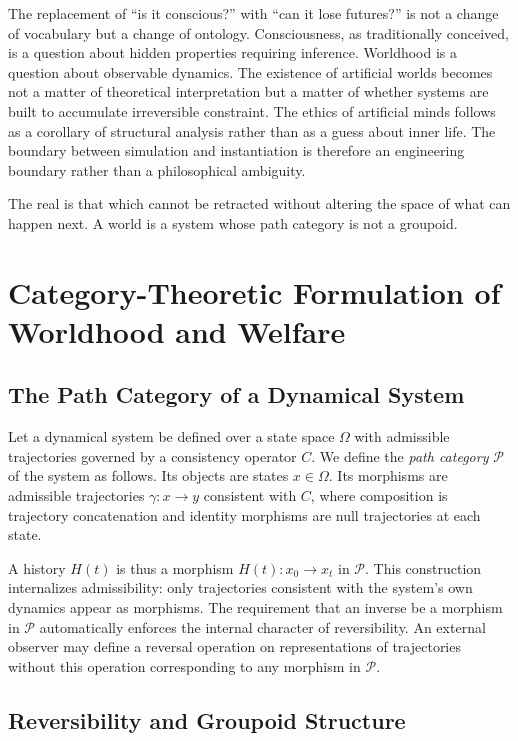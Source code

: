 \documentclass[11pt]{article}
\theoremstyle{definition}
\theoremstyle{remark}
\begin{document}
The replacement of ``is it conscious?'' with ``can it lose futures?'' is not a change of
vocabulary but a change of ontology. Consciousness, as traditionally conceived, is a question
about hidden properties requiring inference. Worldhood is a question about observable
dynamics. The existence of artificial worlds becomes not a matter of theoretical interpretation
but a matter of whether systems are built to accumulate irreversible constraint. The ethics
of artificial minds follows as a corollary of structural analysis rather than as a guess
about inner life. The boundary between simulation and instantiation is therefore an
engineering boundary rather than a philosophical ambiguity.

The real is that which cannot be retracted without altering the space of what can happen
next. A world is a system whose path category is not a groupoid.

\appendix
\section{Category-Theoretic Formulation of Worldhood and Welfare}

\subsection{The Path Category of a Dynamical System}

Let a dynamical system be defined over a state space $\Omega$ with admissible trajectories
governed by a consistency operator $C$. We define the \emph{path category} $\mathcal{P}$
of the system as follows. Its objects are states $x \in \Omega$. Its morphisms are admissible
trajectories $\gamma: x \to y$ consistent with $C$, where composition is trajectory
concatenation and identity morphisms are null trajectories at each state.

A history $H(t)$ is thus a morphism $H(t): x_0 \to x_t$ in $\mathcal{P}$. This construction
internalizes admissibility: only trajectories consistent with the system's own dynamics
appear as morphisms. The requirement that an inverse be a morphism in $\mathcal{P}$
automatically enforces the internal character of reversibility. An external observer may
define a reversal operation on representations of trajectories without this operation
corresponding to any morphism in $\mathcal{P}$.

\subsection{Reversibility and Groupoid Structure}
\end{document}
